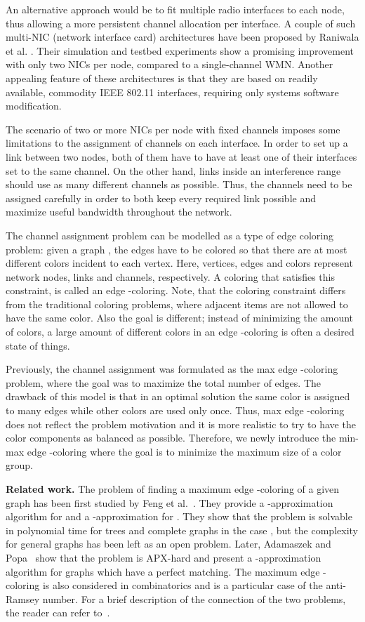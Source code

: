 \documentclass[runningheads, a4paper]{llncs}
\begin{document}
An alternative approach would be to fit multiple radio interfaces to each node, thus allowing a more persistent channel allocation per interface. A couple of such multi-NIC (network interface card) architectures have been proposed by Raniwala et al. \cite{RaniwalaGC04,RaniwalaC05}. Their simulation and testbed experiments show a promising improvement with only two NICs per node, compared to a single-channel WMN. Another appealing feature of these architectures is that they are based on readily available, commodity IEEE 802.11 interfaces, requiring only systems software modification. 

The scenario of two or more NICs per node with fixed channels imposes some limitations to the assignment of channels on each interface. In order to set up a link between two nodes, both of them have to have at least one of their interfaces set to the same channel. On the other hand, links inside an interference range should use as many different channels as possible. Thus, the channels need to be assigned carefully in order to both keep every required link possible and maximize useful bandwidth throughout the network.

The channel assignment problem can be modelled as a type of edge coloring problem: given a graph , the edges have to be colored so that there are at most  different colors incident to each vertex. Here, vertices, edges and colors represent network nodes, links and channels, respectively. A coloring that satisfies this constraint, is called an edge -coloring. Note, that the coloring constraint differs from the traditional coloring problems, where adjacent items are not allowed to have the same color. Also the goal is different; instead of minimizing the amount of colors, a large amount of different colors in an edge -coloring is often a desired state of things.

Previously, the channel assignment was formulated as the max edge -coloring problem, where the goal was to maximize the total number of edges. The drawback of this model is that in an optimal solution the same color is assigned to many edges while other colors are used only once. Thus, max edge -coloring does not reflect the problem motivation and it is more realistic to try to have the color components as balanced as possible. Therefore, we newly introduce the min-max edge -coloring where the goal is to minimize the maximum size of a color group.

\textbf{Related work.} The problem of finding a maximum edge -coloring of a given graph has been first studied by Feng et al.~\cite{FengZQW07,FengCZ08,FengZW09}. They provide a -approximation algorithm for  and a -approximation for . They show that the problem is solvable in polynomial time for trees and complete graphs in the case , but the complexity for general graphs has been left as an open problem. Later, Adamaszek and Popa~\cite{AP10} show that the problem is APX-hard and present a -approximation algorithm for graphs which have a perfect matching.
The maximum edge -coloring is also considered in combinatorics and is a particular case of the anti-Ramsey number. For a brief description of the connection of the two problems, the reader can refer to~\cite{AP10}.
\end{document}
